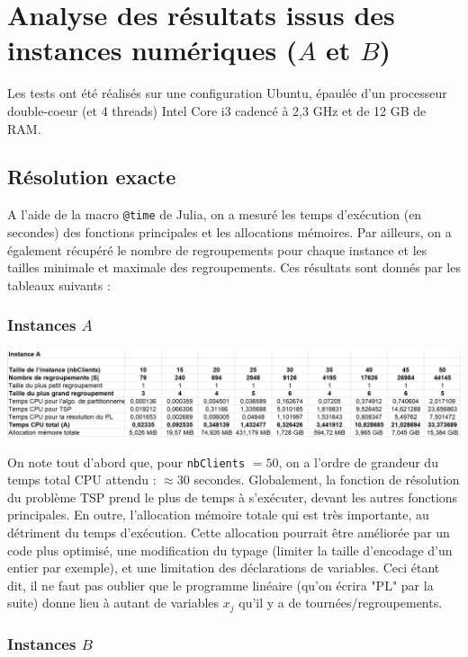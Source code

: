 \documentclass[french, 11pt, a4paper]{article} %
\newcommand{\smb}{\smallbreak}
\begin{document}
\section{Analyse des résultats issus des instances numériques ($A$ et $B$)}

Les tests ont été réalisés sur une configuration Ubuntu, épaulée d'un processeur double-coeur (et 4 threads) Intel Core i3 cadencé à 2,3 GHz et de 12 GB de RAM.

\subsection{Résolution exacte}
A l'aide de la macro \texttt{@time} de Julia, on a mesuré les temps d'exécution (en secondes) des fonctions principales et les allocations mémoires.
Par ailleurs, on a également récupéré le nombre de regroupements pour chaque instance et les tailles minimale et maximale des regroupements.
Ces résultats sont donnés par les tableaux suivants :

\subsubsection{Instances $A$}

\begin{center}
    \includegraphics[scale=0.50]{ResExacte_InstA.PNG}
\end{center}

    On note tout d'abord que, pour \verb+nbClients+ $=50$, on a l'ordre de grandeur du temps total CPU attendu : $\approx 30$ secondes.
    \smb Globalement, la fonction de résolution du problème TSP prend le plus de temps à s'exécuter, devant les autres fonctions principales.
    \smb En outre, l'allocation mémoire totale qui est très importante, au détriment du temps d'exécution.
Cette allocation pourrait être améliorée par un code plus optimisé, une modification du typage (limiter la taille d'encodage d'un entier par exemple),
et une limitation des déclarations de variables. Ceci étant dit, il ne faut pas oublier que le programme linéaire (qu'on écrira "PL" par la suite)
donne lieu à autant de variables $x_j$ qu'il y a de tournées/regroupements. 

\subsubsection{Instances $B$}
\end{document}
